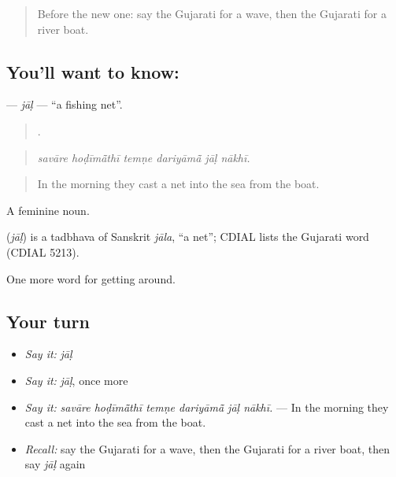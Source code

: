 \begin{quote}
Before the new one: say the Gujarati for a wave, then the Gujarati for a river boat.
\end{quote}

\subsection*{You'll want to know: }
\textbf{} — \emph{jāḷ} — \textquotedblleft{}a fishing net\textquotedblright{}.

\begin{quote}
     .
\end{quote}

\begin{quote}
\emph{savāre hoḍīmā̃thī temṇe dariyāmā̃ jāḷ nākhī.}
\end{quote}

\begin{quote}
In the morning they cast a net into the sea from the boat.
\end{quote}

A feminine noun.

\begin{cousinweb}
\textbf{} (\emph{jāḷ}) is a tadbhava of Sanskrit \emph{jāla}, \textquotedblleft{}a net\textquotedblright{}; CDIAL lists the Gujarati word (CDIAL 5213).
\end{cousinweb}

\begin{grammarlens}[title={What you've built}]
One more word for getting around.
\end{grammarlens}

\subsection*{Your turn}
\begin{itemize}
\raggedright
  \item \emph{Say it:} \emph{jāḷ}
  \item \emph{Say it:} \emph{jāḷ}, once more
  \item \emph{Say it:} \emph{savāre hoḍīmā̃thī temṇe dariyāmā̃ jāḷ nākhī.} — In the morning they cast a net into the sea from the boat.
  \item \emph{Recall:} say the Gujarati for a wave, then the Gujarati for a river boat, then say \emph{jāḷ} again
\end{itemize}

